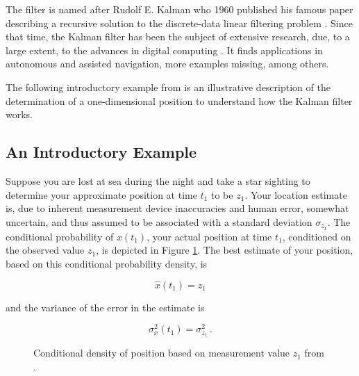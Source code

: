 The filter is named after Rudolf E. Kalman who 1960 published his famous paper describing a recursive solution to the discrete-data linear filtering problem \cite{kalman_1960}. Since that time, the Kalman filter has been the subject of extensive research, due, to a large extent, to the advances in digital computing \cite{welch2014}. It finds applications in autonomous and assisted navigation, more examples missing, among others.

The following introductory example from \cite{Maybeck79} is an illustrative description of the determination of a one-dimensional position to understand how the Kalman filter works.

\subsection{An Introductory Example}

Suppose you are lost at sea during the night and take a star sighting to determine your approximate position at time $t_1$ to be $z_1$. Your location estimate is, due to inherent measurement device inaccuracies and human error, somewhat uncertain, and thus assumed to be associated with a standard deviation $\sigma_{z_1}$. The conditional probability of $x(t_1)$, your actual position at time $t_1$, conditioned on the observed value $z_1$, is depicted in Figure \ref{fig:measurement_z1}. The best estimate of your position, based on this conditional probability density, is

\begin{equation}
  \hat{x}(t_1)=z_1
\end{equation}

\noindent
and the variance of the error in the estimate is

\begin{equation}
  \sigma^2_x(t_1)=\sigma^2_{z_1}\,.
\end{equation}

\begin{figure}
\centering
{}
\caption{Conditional density of position based on measurement value $z_1$ from \cite{Maybeck79}.} \label{fig:measurement_z1}
\end{figure}

